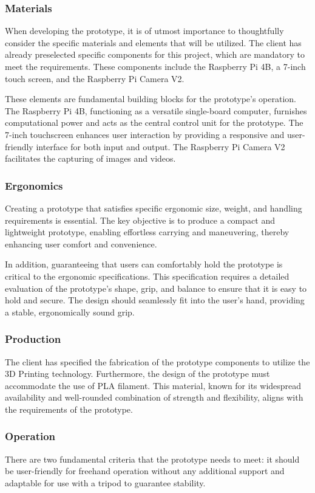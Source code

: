 \subsubsection{Materials}
When developing the prototype, it is of utmost importance to thoughtfully consider the specific materials and elements that will be utilized. The client has already preselected specific components for this project, which are mandatory to meet the requirements. These components include the Raspberry Pi 4B, a 7-inch touch screen, and the Raspberry Pi Camera V2.

These elements are fundamental building blocks for the prototype's operation. The Raspberry Pi 4B, functioning as a versatile single-board computer, furnishes computational power and acts as the central control unit for the prototype. The 7-inch touchscreen enhances user interaction by providing a responsive and user-friendly interface for both input and output. The Raspberry Pi Camera V2 facilitates the capturing of images and videos.

\subsubsection{Ergonomics}
Creating a prototype that satisfies specific ergonomic size, weight, and handling requirements is essential. The key objective is to produce a compact and lightweight prototype, enabling effortless carrying and maneuvering, thereby enhancing user comfort and convenience.

In addition, guaranteeing that users can comfortably hold the prototype is critical to the ergonomic specifications. This specification requires a detailed evaluation of the prototype's shape, grip, and balance to ensure that it is easy to hold and secure. The design should seamlessly fit into the user's hand, providing a stable, ergonomically sound grip.

\subsubsection{Production}
The client has specified the fabrication of the prototype components to utilize the 3D Printing technology. Furthermore, the design of the prototype must accommodate the use of PLA filament. This material, known for its widespread availability and well-rounded combination of strength and flexibility, aligns with the requirements of the prototype.

\subsubsection{Operation}
There are two fundamental criteria that the prototype needs to meet: it should be user-friendly for freehand operation without any additional support and adaptable for use with a tripod to guarantee stability.


